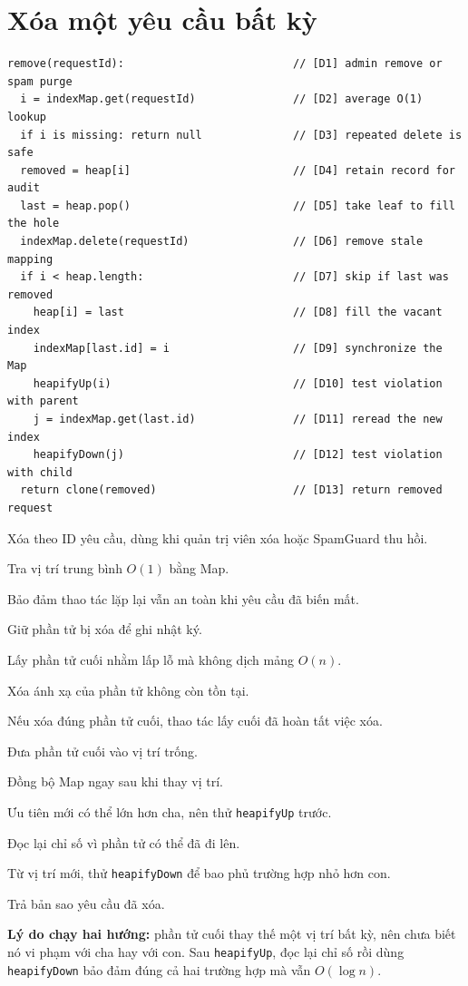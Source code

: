 \documentclass[12pt,a4paper,twoside,openright]{report}
\newcommand{\code}[1]{\texttt{#1}}
\begin{document}
\section{Xóa một yêu cầu bất kỳ}
\begin{lstlisting}[style=algorithm]
remove(requestId):                          // [D1] admin remove or spam purge
  i = indexMap.get(requestId)               // [D2] average O(1) lookup
  if i is missing: return null              // [D3] repeated delete is safe
  removed = heap[i]                         // [D4] retain record for audit
  last = heap.pop()                         // [D5] take leaf to fill the hole
  indexMap.delete(requestId)                // [D6] remove stale mapping
  if i < heap.length:                       // [D7] skip if last was removed
    heap[i] = last                          // [D8] fill the vacant index
    indexMap[last.id] = i                   // [D9] synchronize the Map
    heapifyUp(i)                            // [D10] test violation with parent
    j = indexMap.get(last.id)               // [D11] reread the new index
    heapifyDown(j)                          // [D12] test violation with child
  return clone(removed)                     // [D13] return removed request
\end{lstlisting}
\begin{description}[leftmargin=1.2cm,labelwidth=0.8cm,style=multiline,
  font=\ttfamily\bfseries,itemsep=2pt]
  \item[D1] Xóa theo ID yêu cầu, dùng khi quản trị viên xóa hoặc SpamGuard thu hồi.
  \item[D2] Tra vị trí trung bình $O(1)$ bằng Map.
  \item[D3] Bảo đảm thao tác lặp lại vẫn an toàn khi yêu cầu đã biến mất.
  \item[D4] Giữ phần tử bị xóa để ghi nhật ký.
  \item[D5] Lấy phần tử cuối nhằm lấp lỗ mà không dịch mảng $O(n)$.
  \item[D6] Xóa ánh xạ của phần tử không còn tồn tại.
  \item[D7] Nếu xóa đúng phần tử cuối, thao tác lấy cuối đã hoàn tất việc xóa.
  \item[D8] Đưa phần tử cuối vào vị trí trống.
  \item[D9] Đồng bộ Map ngay sau khi thay vị trí.
  \item[D10] Ưu tiên mới có thể lớn hơn cha, nên thử \code{heapifyUp} trước.
  \item[D11] Đọc lại chỉ số vì phần tử có thể đã đi lên.
  \item[D12] Từ vị trí mới, thử \code{heapifyDown} để bao phủ trường hợp nhỏ hơn con.
  \item[D13] Trả bản sao yêu cầu đã xóa.
\end{description}
\textbf{Lý do chạy hai hướng:} phần tử cuối thay thế một vị trí bất kỳ, nên chưa biết nó
vi phạm với cha hay với con. Sau \code{heapifyUp}, đọc lại chỉ số rồi dùng \code{heapifyDown}
bảo đảm đúng cả
hai trường hợp mà vẫn $O(\log n)$.
\end{document}
